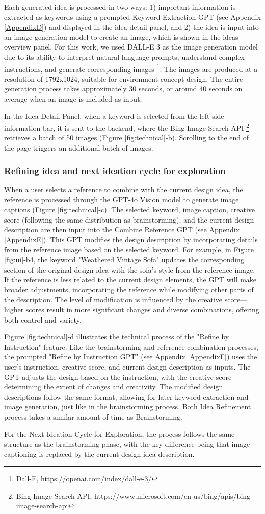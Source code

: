 Each generated idea is processed in two ways: 1) important information is extracted as keywords using a prompted Keyword Extraction GPT (see Appendix \ref{AppendixD}) and displayed in the idea detail panel, and 2) the idea is input into an image generation model to create an image, which is shown in the ideas overview panel. For this work, we used DALL-E 3 as the image generation model due to its ability to interpret natural language prompts, understand complex instructions, and generate corresponding images \footnote{Dall-E, https://openai.com/index/dall-e-3/}. The images are produced at a resolution of 1792x1024, suitable for environment concept design. The entire generation process takes approximately 30 seconds, or around 40 seconds on average when an image is included as input.

In the Idea Detail Panel, when a keyword is selected from the left-side information bar, it is sent to the backend, where the Bing Image Search API \footnote{Bing Image Search API, https://www.microsoft.com/en-us/bing/apis/bing-image-search-api} retrieves a batch of 50 images (Figure \ref{fig:technical}-b). Scrolling to the end of the page triggers an additional batch of images.

\subsubsection{Refining idea and next ideation cycle for exploration}
When a user selects a reference to combine with the current design idea, the reference is processed through the GPT-4o Vision model to generate image captions (Figure \ref{fig:technical}-c). The selected keyword, image caption, creative score (following the same distribution as brainstorming), and the current design description are then input into the Combine Reference GPT (see Appendix \ref{AppendixE}). This GPT modifies the design description by incorporating details from the reference image based on the selected keyword. For example, in Figure \ref{fig:ui}-b4, the keyword "Weathered Vintage Sofa" updates the corresponding section of the original design idea with the sofa's style from the reference image. If the reference is less related to the current design elements, the GPT will make broader adjustments, incorporating the reference while modifying other parts of the description. The level of modification is influenced by the creative score—higher scores result in more significant changes and diverse combinations, offering both control and variety. 

Figure \ref{fig:technical}-d illustrates the technical process of the "Refine by Instruction" feature. Like the brainstorming and reference combination processes, the prompted "Refine by Instruction GPT" (see Appendix \ref{AppendixF}) uses the user’s instruction, creative score, and current design description as inputs. The GPT adjusts the design based on the instruction, with the creative score determining the extent of changes and creativity. The modified design descriptions follow the same format, allowing for later keyword extraction and image generation, just like in the brainstorming process. Both Idea Refinement process takes a similar amount of time as Brainstorming.

For the Next Ideation Cycle for Exploration, the process follows the same structure as the brainstorming phase, with the key difference being that image captioning is replaced by the current design idea description.
